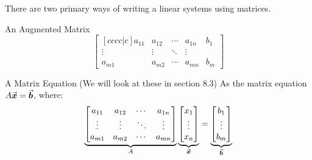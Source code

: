 \documentclass{beamer}
\begin{document}
\begin{frame}
\begin{block}{}
There are two primary ways of writing a linear systems using matrices.
\end{block}\pause
\begin{block}{An Augmented Matrix}
\begin{equation*}
\begin{bmatrix}[cccc|c]
a_{11}&a_{12}&\cdots&a_{1n}&b_1\\
\vdots&\vdots&\ddots&\vdots&\\
a_{m1}&a_{m2}&\cdots&a_{mn}&b_m
\end{bmatrix}
\end{equation*}
\end{block}\pause
\begin{block}{A Matrix Equation (We will look at these in section 8.3)}
As the matrix equation $A{\vec{\boldsymbol{x}}}={\vec{\boldsymbol{b}}}$, where:
\begin{equation*}
\underbrace{\begin{bmatrix}
a_{11}&a_{12}&\cdots&a_{1n}\\
\vdots&\vdots&\ddots&\vdots\\
a_{m1}&a_{m2}&\cdots&a_{mn}
\end{bmatrix}}_A
\underbrace{\begin{bmatrix}
x_1\\\vdots\\x_n
\end{bmatrix}}_{\vec{\boldsymbol{x}}}
=
\underbrace{\begin{bmatrix}
b_1\\\vdots\\b_m
\end{bmatrix}}_{\vec{\boldsymbol{b}}}
\end{equation*}
\end{block}
\end{frame}
\end{document}
